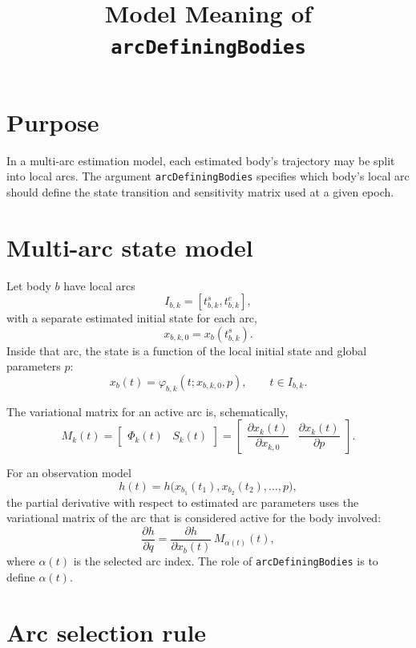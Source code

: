\documentclass[11pt,a4paper]{article}
\title{\vspace{-1.5em}Model Meaning of \texttt{arcDefiningBodies}}
\author{}
\date{}
\begin{document}
\maketitle
\vspace{-2.5em}

\section*{Purpose}

In a multi-arc estimation model, each estimated body's trajectory may be split into
local arcs. The argument \texttt{arcDefiningBodies} specifies which body's local
arc should define the state transition and sensitivity matrix used at a given
epoch.

\section*{Multi-arc state model}

Let body \(b\) have local arcs
\[
    I_{b,k} = [t^s_{b,k}, t^e_{b,k}],
\]
with a separate estimated initial state for each arc,
\[
    x_{b,k,0} = x_b(t^s_{b,k}).
\]
Inside that arc, the state is a function of the local initial state and global
parameters \(p\):
\[
    x_b(t) = \varphi_{b,k}(t; x_{b,k,0}, p),
    \qquad t \in I_{b,k}.
\]

The variational matrix for an active arc is, schematically,
\[
    M_k(t)
    =
    \begin{bmatrix}
        \Phi_k(t) & S_k(t)
    \end{bmatrix}
    =
    \begin{bmatrix}
        \dfrac{\partial x_k(t)}{\partial x_{k,0}} &
        \dfrac{\partial x_k(t)}{\partial p}
    \end{bmatrix}.
\]

For an observation model
\[
    h(t) = h\big(x_{b_1}(t_1), x_{b_2}(t_2), \ldots, p\big),
\]
the partial derivative with respect to estimated arc parameters uses the
variational matrix of the arc that is considered active for the body involved:
\[
    \frac{\partial h}{\partial q}
    =
    \frac{\partial h}{\partial x_b(t)}
    \,
    M_{\alpha(t)}(t),
\]
where \(\alpha(t)\) is the selected arc index. The role of
\texttt{arcDefiningBodies} is to define \(\alpha(t)\).

\section*{Arc selection rule}
\end{document}
